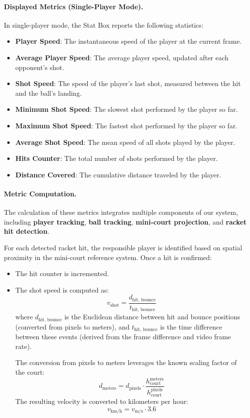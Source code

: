 \paragraph{Displayed Metrics (Single-Player Mode).}  
In single-player mode, the Stat Box reports the following statistics:
\begin{itemize}
    \item \textbf{Player Speed}: The instantaneous speed of the player at the current frame.
    \item \textbf{Average Player Speed}: The average player speed, updated after each opponent’s shot.
    \item \textbf{Shot Speed}: The speed of the player's last shot, measured between the hit and the ball's landing.
    \item \textbf{Minimum Shot Speed}: The slowest shot performed by the player so far.
    \item \textbf{Maximum Shot Speed}: The fastest shot performed by the player so far.
    \item \textbf{Average Shot Speed}: The mean speed of all shots played by the player.
    \item \textbf{Hits Counter}: The total number of shots performed by the player.
    \item \textbf{Distance Covered}: The cumulative distance traveled by the player.
\end{itemize}

\paragraph{Metric Computation.}  
The calculation of these metrics integrates multiple components of our system, including \textbf{player tracking}, \textbf{ball tracking}, \textbf{mini-court projection}, and \textbf{racket hit detection}.  

For each detected racket hit, the responsible player is identified based on spatial proximity in the mini-court reference system. Once a hit is confirmed:
\begin{itemize}
    \item The hit counter is incremented.
    \item The shot speed is computed as:
    \[
    v_{\text{shot}} = \frac{d_{\text{hit, bounce}}}{t_{\text{hit, bounce}}}
    \]
    where $d_{\text{hit, bounce}}$ is the Euclidean distance between hit and bounce positions (converted from pixels to meters), and $t_{\text{hit, bounce}}$ is the time difference between these events (derived from the frame difference and video frame rate).
    
    The conversion from pixels to meters leverages the known scaling factor of the court:
    \[
    d_{\text{meters}} = d_{\text{pixels}} \cdot \frac{h_{\text{court}}^{\text{meters}}}{h_{\text{court}}^{\text{pixels}}}
    \]
    The resulting velocity is converted to kilometers per hour:
    \[
    v_{\text{km/h}} = v_{\text{m/s}} \cdot 3.6
    \]
\end{itemize}
  

